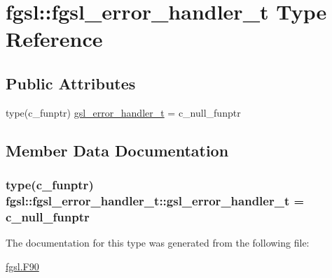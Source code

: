 \hypertarget{structfgsl_1_1fgsl__error__handler__t}{\section{fgsl\-:\-:fgsl\-\_\-error\-\_\-handler\-\_\-t Type Reference}
\label{structfgsl_1_1fgsl__error__handler__t}
}
\subsection*{Public Attributes}
\begin{DoxyCompactItemize}
\item 
type(c\-\_\-funptr) \hyperlink{structfgsl_1_1fgsl__error__handler__t_a1686e995c1c7a589469b53b3a86a84a0}{gsl\-\_\-error\-\_\-handler\-\_\-t} = c\-\_\-null\-\_\-funptr
\end{DoxyCompactItemize}


\subsection{Member Data Documentation}
\hypertarget{structfgsl_1_1fgsl__error__handler__t_a1686e995c1c7a589469b53b3a86a84a0}{
\subsubsection[{gsl\-\_\-error\-\_\-handler\-\_\-t}]{\setlength{\rightskip}{0pt plus 5cm}type(c\-\_\-funptr) fgsl\-::fgsl\-\_\-error\-\_\-handler\-\_\-t\-::gsl\-\_\-error\-\_\-handler\-\_\-t = c\-\_\-null\-\_\-funptr}}\label{structfgsl_1_1fgsl__error__handler__t_a1686e995c1c7a589469b53b3a86a84a0}


The documentation for this type was generated from the following file\-:\begin{DoxyCompactItemize}
\item 
\hyperlink{fgsl_8F90}{fgsl.\-F90}\end{DoxyCompactItemize}

